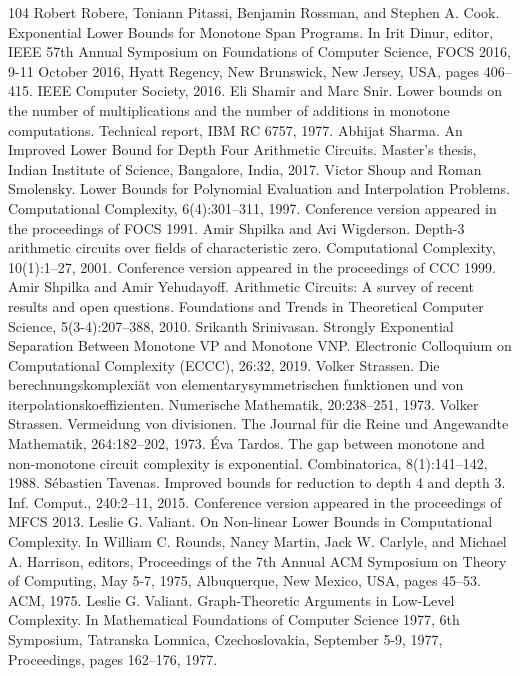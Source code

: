 \documentclass[10pt,a4paper]{article}
\begin{document}
\begin{thebibliography}{104}
 Robert Robere, Toniann Pitassi, Benjamin Rossman, and Stephen A. Cook. Exponential Lower Bounds for Monotone Span Programs. In Irit Dinur, editor, IEEE 57th Annual Symposium on Foundations of Computer Science, FOCS 2016, 9-11 October 2016, Hyatt Regency, New Brunswick, New Jersey, USA, pages 406–415. IEEE Computer Society, 2016.
 Eli Shamir and Marc Snir. Lower bounds on the number of multiplications and the number of additions in monotone computations. Technical report, IBM RC 6757, 1977.
 Abhijat Sharma. An Improved Lower Bound for Depth Four Arithmetic Circuits. Master’s thesis, Indian Institute of Science, Bangalore, India, 2017.
 Victor Shoup and Roman Smolensky. Lower Bounds for Polynomial Evaluation and Interpolation Problems. Computational Complexity, 6(4):301–311, 1997. Conference version appeared in the proceedings of FOCS 1991.
 Amir Shpilka and Avi Wigderson. Depth-3 arithmetic circuits over fields of characteristic zero. Computational Complexity, 10(1):1–27, 2001. Conference version appeared in the proceedings of CCC 1999.
 Amir Shpilka and Amir Yehudayoff. Arithmetic Circuits: A survey of recent results and open questions. Foundations and Trends in Theoretical Computer Science, 5(3-4):207–388, 2010.
 Srikanth Srinivasan. Strongly Exponential Separation Between Monotone VP and Monotone VNP. Electronic Colloquium on Computational Complexity (ECCC), 26:32, 2019.
 Volker Strassen. Die berechnungskomplexiät von elementarysymmetrischen funktionen und von iterpolationskoeffizienten. Numerische Mathematik, 20:238–251, 1973.
 Volker Strassen. Vermeidung von divisionen. The Journal für die Reine und Angewandte Mathematik, 264:182–202, 1973.
 Éva Tardos. The gap between monotone and non-monotone circuit complexity is exponential. Combinatorica, 8(1):141–142, 1988.
 Sébastien Tavenas. Improved bounds for reduction to depth 4 and depth 3. Inf. Comput., 240:2–11, 2015. Conference version appeared in the proceedings of MFCS 2013.
 Leslie G. Valiant. On Non-linear Lower Bounds in Computational Complexity. In William C. Rounds, Nancy Martin, Jack W. Carlyle, and Michael A. Harrison, editors, Proceedings of the 7th Annual ACM Symposium on Theory of Computing, May 5-7, 1975, Albuquerque, New Mexico, USA, pages 45–53. ACM, 1975.
 Leslie G. Valiant. Graph-Theoretic Arguments in Low-Level Complexity. In Mathematical Foundations of Computer Science 1977, 6th Symposium, Tatranska Lomnica, Czechoslovakia, September 5-9, 1977, Proceedings, pages 162–176, 1977.

\end{thebibliography}
\end{document}
